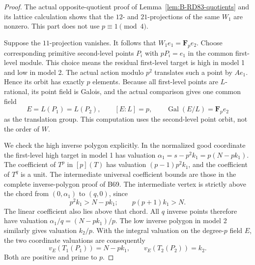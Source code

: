\begin{proof}
The actual opposite-quotient proof of
Lemma~\ref{lem:B-RD83-quotients} and its lattice calculation
shows that the \(12\)- and \(21\)-projections of the same
\(W_1\) are nonzero. This part does not use
\(p\equiv1\pmod4\).

Suppose the \(11\)-projection vanishes. It follows that
\(W_1e_1=\mathbf F_pe_2\). Choose corresponding primitive
second-level points \(P_i\) with \(pP_i=e_1\) in the
common first-level module. This choice means the residual
first-level target is high in model 1 and low in model 2.
The actual action modulo \(p^2\) translates such a point
by \(Ae_1\). Hence its orbit has exactly \(p\) elements.
Because all first-level points are \(L\)-rational, its
point field is Galois, and the actual comparison gives
one common field
\[
       E=L(P_1)=L(P_2),\qquad [E:L]=p,
       \qquad\operatorname{Gal}(E/L)=\mathbf F_pe_2
                                                        \tag{B-RD85.3}
\]
as the translation group. This computation uses the
second-level point orbit, not the order of \(W\).

We check the high inverse polygon explicitly. In the
normalized good coordinate the first-level high target
in model 1 has valuation
\(\alpha_1=s-p^2k_1=p(N-pk_1)\). The coefficient of
\(T^p\) in \([p](T)\) has valuation
\((p-1)p^2k_1\), and the coefficient of \(T^q\) is a
unit. The intermediate universal coefficient bounds
are those in the complete inverse-polygon proof of B69.
The intermediate vertex is strictly above the chord
from \((0,\alpha_1)\) to \((q,0)\), since
\[
          p^2k_1>N-pk_1;
       \qquad p(p+1)k_1>N.                           \tag{B-RD85.4}
\]
The linear coefficient also lies above that chord.
All \(q\) inverse points therefore have valuation
\(\alpha_1/q=(N-pk_1)/p\). The low inverse polygon
in model 2 similarly gives valuation \(k_2/p\).
With the integral valuation on the degree-\(p\) field
\(E\), the two coordinate valuations are consequently
\[
               v_E(T_1(P_1))=N-pk_1,
             \qquad v_E(T_2(P_2))=k_2.               \tag{B-RD85.5}
\]
Both are positive and prime to \(p\).


\end{proof}
